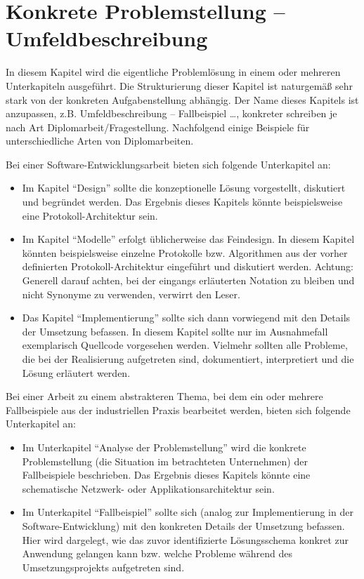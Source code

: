 \chapter{Konkrete Problemstellung -- Umfeldbeschreibung}
\label{sec:problemdescription}

In diesem Kapitel wird die eigentliche Problemlösung in einem oder mehreren Unterkapiteln ausgeführt. Die Strukturierung dieser Kapitel ist naturgemäß sehr stark von der konkreten Aufgabenstellung abhängig. Der Name dieses Kapitels ist anzupassen, z.B. Umfeldbeschreibung -- Fallbeispiel \dots, konkreter schreiben je nach Art Diplomarbeit/Fragestellung. Nachfolgend einige Beispiele für unterschiedliche Arten von Diplomarbeiten. 

Bei einer Software-Entwicklungsarbeit bieten sich folgende Unterkapitel an:
\begin{itemize}
	\item Im Kapitel \enquote{Design} sollte die konzeptionelle Lösung vorgestellt, diskutiert und begründet werden. Das Ergebnis dieses Kapitels könnte beispielsweise eine Protokoll-Architektur sein.
	\item Im Kapitel \enquote{Modelle} erfolgt üblicherweise das Feindesign. In diesem Kapitel könnten beispielsweise einzelne Protokolle bzw. Algorithmen aus der vorher definierten Protokoll-Architektur eingeführt und diskutiert werden. Achtung: Generell darauf achten, bei der eingangs erläuterten Notation zu bleiben und nicht Synonyme zu verwenden, verwirrt den Leser.
	\item Das Kapitel \enquote{Implementierung} sollte sich dann vorwiegend mit den Details der Umsetzung befassen. In diesem Kapitel sollte nur im Ausnahmefall exemplarisch Quellcode vorgesehen werden. Vielmehr sollten alle Probleme, die bei der Realisierung aufgetreten sind, dokumentiert, interpretiert und die Lösung erläutert werden.
\end{itemize}

Bei einer Arbeit zu einem abstrakteren Thema, bei dem ein oder mehrere Fallbeispiele aus der industriellen Praxis bearbeitet werden, bieten sich folgende Unterkapitel an:
\begin{itemize}
	\item Im Unterkapitel \enquote{Analyse der Problemstellung} wird die konkrete Problemstellung (die Situation im betrachteten Unternehmen) der Fallbeispiele beschrieben. Das Ergebnis dieses Kapitels könnte eine schematische Netzwerk- oder Applikationsarchitektur sein.
	\item Im Unterkapitel \enquote{Fallbeispiel} sollte sich (analog zur Implementierung in der Software-Entwicklung) mit den konkreten Details der Umsetzung befassen. Hier wird dargelegt, wie das zuvor identifizierte Lösungsschema konkret zur Anwendung gelangen kann bzw. welche Probleme während des Umsetzungsprojekts aufgetreten sind.
\end{itemize}


